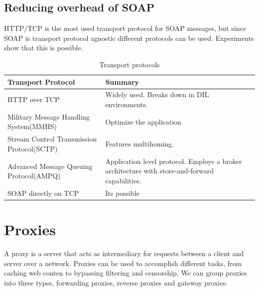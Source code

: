 \documentclass[USenglish]{article}
\begin{document}
\subsection{Reducing overhead of SOAP}
HTTP/TCP is the most used transport protocol for SOAP messages, but since SOAP is transport protocol agnostic different protocols can be used. Experiments show that this is possible.


\begin{table}[h]
\begin{tabularx}{\textwidth}{| X | X |}
\hline
  \textbf{Transport Protocol} & \textbf{Summary} \\ \hline
  HTTP over TCP & Widely used. Breaks down in DIL environments.\\ \hline
  Military Message Handling System(MMHS) & Optimize the application\\ \hline
  Stream Control Transmission Protocol(SCTP) & Features multihoming. \\ \hline
  Advanced Message Queuing Protocol(AMPQ) & Application level protocol. Employs a broker architecture with store-and-forward capabilities. \\ \hline
  SOAP directly on TCP & Its possible \\ \hline
\end{tabularx}
\caption{Transport protocols}
\end{table}

\section{Proxies}
A proxy is a server that acts as intermediary for requests between a client and server over a network. Proxies can be used to accomplish different tasks, from caching web conten to bypassing filtering and censorship. We can group proxies into three types, forwarding proxies, reverse proxies and gateway proxies.
\end{document}
